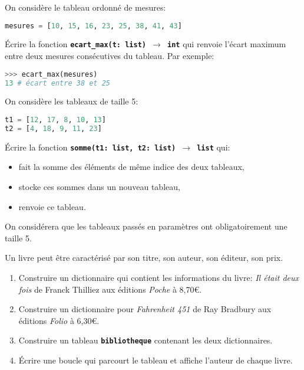 \documentclass[a4paper,11pt]{article}
\begin{document}
\begin{exo}
On considère le tableau ordonné de mesures:
\begin{lstlisting}[language=Python  , xleftmargin=2em, xrightmargin=2em]
mesures = [10, 15, 16, 23, 25, 38, 41, 43]
\end{lstlisting}
Écrire la fonction \textbf{\texttt{ecart\_max(t: list) $\rightarrow$ int}} qui renvoie l'écart maximum entre deux mesures consécutives du tableau. Par exemple:
\begin{lstlisting}[language=Python  , xleftmargin=2em, xrightmargin=2em]
>>> ecart_max(mesures)
13 # écart entre 38 et 25
\end{lstlisting}
\end{exo}
\begin{exo}
    On considère les tableaux de taille 5:
    \begin{lstlisting}[language=Python  , xleftmargin=2em, xrightmargin=2em]
t1 = [12, 17, 8, 10, 13]
t2 = [4, 18, 9, 11, 23]
\end{lstlisting}
    Écrire la fonction \textbf{\texttt{somme(t1: list, t2: list) $\rightarrow$ list}} qui:
    \begin{itemize}
        \item fait la somme des éléments de même indice des deux tableaux,
        \item stocke ces sommes dans un nouveau tableau,
        \item renvoie ce tableau.
    \end{itemize}
On considérera que les tableaux passés en paramètres ont obligatoirement une taille 5.
\end{exo}
\begin{exo}Un livre peut être caractérisé par son titre, son auteur, son éditeur, son prix.
    \begin{enumerate}
        \item Construire un dictionnaire qui contient les informations du livre: \emph{Il était deux fois} de Franck Thilliez aux éditions \emph{Poche} à 8,70€.
        \item Construire un dictionnaire pour \emph{Fahrenheit 451} de Ray Bradbury aux éditions \emph{Folio} à 6,30€.
        \item Construire un tableau \textbf{\texttt{bibliotheque}} contenant les deux dictionnaires.
        \item Écrire une boucle qui parcourt le tableau et affiche l'auteur de chaque livre.
    \end{enumerate}
\end{exo}
\end{document}
